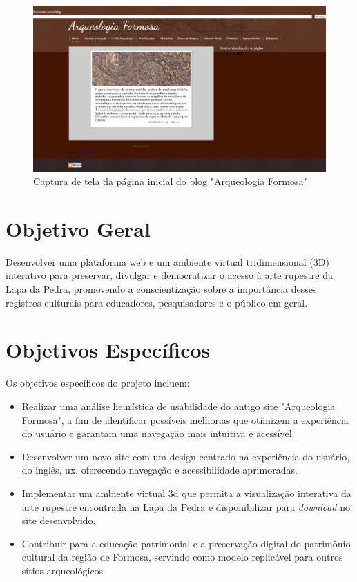 \begin{figure}
    \centering
    \includegraphics[width=1\linewidth]{images/home-blog-print.png}
    \caption{Captura de tela da página inicial do blog \href{https://arqueologiaformosa.blogspot.com/}{"Arqueologia Formosa"}}
    \label{fig:Captura de tela da página inicial do blog}
\end{figure}

\section{Objetivo Geral}
Desenvolver uma plataforma web e um ambiente virtual tridimensional (3D) interativo para preservar, divulgar e democratizar o acesso à arte rupestre da Lapa da Pedra, promovendo a conscientização sobre a importância desses registros culturais para educadores, pesquisadores e o público em geral.

\section{Objetivos Específicos}
Os objetivos específicos do projeto incluem:
\begin{itemize}
    \item Realizar uma análise heurística de usabilidade do antigo site "Arqueologia Formosa", a fim de identificar possíveis melhorias que otimizem a experiência do usuário e garantam uma navegação mais intuitiva e acessível.
    \item Desenvolver um novo site com um design centrado na experiência do usuário, do inglês, \gls{ux}, oferecendo navegação e acessibilidade aprimoradas.
    \item Implementar um ambiente virtual \gls{3d} que permita a visualização interativa da arte rupestre encontrada na Lapa da Pedra e disponibilizar para \textit{download} no site desenvolvido.
    \item Contribuir para a educação patrimonial e a preservação digital do patrimônio cultural da região de Formosa, servindo como modelo replicável para outros sítios arqueológicos.
\end{itemize}


